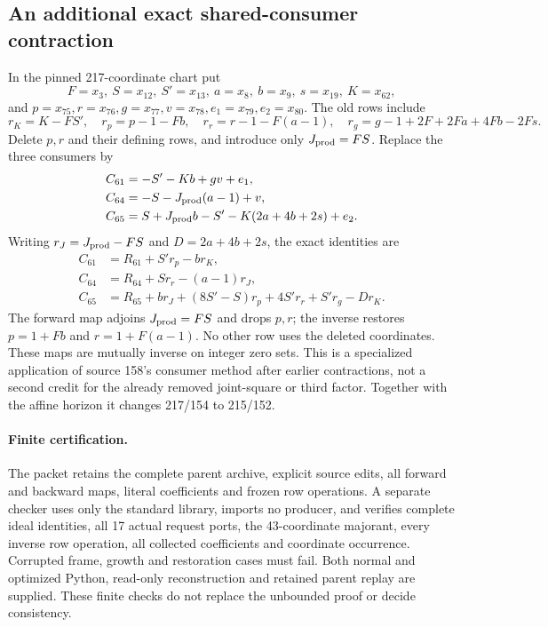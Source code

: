 \subsection*{An additional exact shared-consumer contraction}
In the pinned 217-coordinate chart put
\[
 F=x_3,\ S=x_{12},\ S'=x_{13},\ a=x_8,\ b=x_9,\ s=x_{19},\ K=x_{62},
\]
and $p=x_{75},r=x_{76},g=x_{77},v=x_{78},e_1=x_{79},e_2=x_{80}$.
The old rows include
\[
 r_K=K-FS',\quad r_p=p-1-Fb,\quad
 r_r=r-1-F(a-1),\quad
 r_g=g-1+2F+2Fa+4Fb-2Fs.
\]
Delete $p,r$ and their defining rows, and introduce only $J_{\rm prod}=FS$.
Replace the three consumers by
\[
\begin{aligned}
 C_{61}&=-S'-Kb+gv+e_1,\\
 C_{64}&=-S-J_{\rm prod}(a-1)+v,\\
 C_{65}&=S+J_{\rm prod}b-S'-K(2a+4b+2s)+e_2.
\end{aligned}
\]
Writing $r_J=J_{\rm prod}-FS$ and $D=2a+4b+2s$, the exact identities are
\[
\begin{aligned}
 C_{61}&=R_{61}+S'r_p-br_K,\\
 C_{64}&=R_{64}+Sr_r-(a-1)r_J,\\
 C_{65}&=R_{65}+br_J+(8S'-S)r_p+4S'r_r+S'r_g-Dr_K.
\end{aligned}
\]
The forward map adjoins $J_{\rm prod}=FS$ and drops $p,r$; the inverse restores
$p=1+Fb$ and $r=1+F(a-1)$.  No other row uses the deleted coordinates.
These maps are mutually inverse on integer zero sets.  This is a specialized
application of source 158's consumer method after earlier contractions,
not a second credit for the already removed joint-square or third factor.
Together with the affine horizon it changes 217/154 to 215/152.

\paragraph{Finite certification.}
The packet retains the complete parent archive, explicit source edits,
all forward and backward maps, literal coefficients and frozen row operations.
A separate checker uses only the standard library, imports no producer, and
verifies complete ideal identities, all 17 actual request ports, the 43-coordinate
majorant, every inverse row operation, all collected coefficients and
coordinate occurrence.  Corrupted frame, growth and restoration cases must
fail.  Both normal and optimized Python, read-only reconstruction and retained
parent replay are supplied.  These finite checks do not replace the unbounded
proof or decide consistency.
